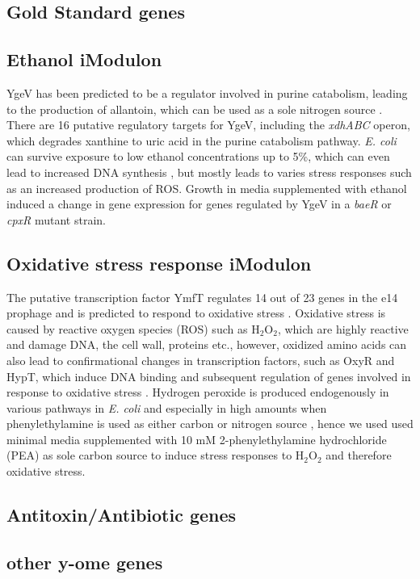 \subsection{Gold Standard genes}
\subsection{Ethanol iModulon}
YgeV has been predicted to be a regulator involved in purine catabolism, leading to the production of allantoin, which can be used as a sole nitrogen source \cite{iwadate2019identification}. There are 16 putative regulatory targets \cite{lamoureux2021precise} for YgeV, including the \textit{xdhABC} operon, which degrades xanthine to uric acid \cite{iwadate2019identification} in the purine catabolism pathway. \textit{E. coli} can survive exposure to low ethanol concentrations up to 5\%, which can even lead to increased DNA synthesis \cite{basu1994effect}, but mostly leads to varies stress responses such as an increased production of ROS. Growth in media supplemented with ethanol induced a change in gene expression for genes regulated by YgeV in a \textDelta\textit{baeR} or \textDelta\textit{cpxR} mutant strain. 
\subsection{Oxidative stress response iModulon}
The putative transcription factor YmfT regulates 14 out of 23 genes in the e14 prophage and is predicted to respond to oxidative stress \cite{lamoureux2021precise}. Oxidative stress is caused by reactive oxygen species (ROS) such as $\text{H}_2\text{O}_2$, which are highly reactive and damage DNA, the cell wall, proteins \cite{ezraty2017oxidative} etc., however, oxidized amino acids can also lead to confirmational changes in transcription factors, such as OxyR and HypT, which induce DNA binding and subsequent regulation of genes involved in response to oxidative stress  \cite{ezraty2017oxidative}. Hydrogen peroxide is produced endogenously in various pathways in \textit{E. coli} and especially in high amounts when phenylethylamine is used as either carbon or nitrogen source \cite{ravindra2013escherichia}, hence we used used minimal media supplemented with 10 mM 2-phenylethylamine hydrochloride (PEA) as sole carbon source to induce stress responses to $\text{H}_2\text{O}_2$ and therefore oxidative stress. 
\subsection{Antitoxin/Antibiotic genes}
\subsection{other y-ome genes}
